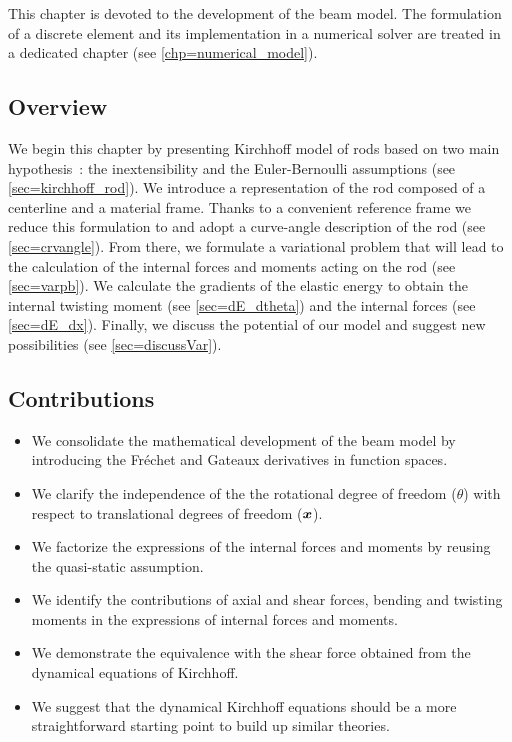 This chapter is devoted to the development of the beam model. The formulation of a discrete element and its implementation in a numerical solver are treated in a dedicated chapter (see \cref{chp=numerical_model}).

\subsection{Overview}
We begin this chapter by presenting Kirchhoff model of rods based on two main hypothesis~: the inextensibility and the Euler-Bernoulli assumptions (see \cref{sec=kirchhoff_rod}). We introduce a  representation of the rod composed of a centerline and a material frame. Thanks to a convenient reference frame we reduce this formulation to  and adopt a curve-angle description of the rod (see \cref{sec=crvangle}). From there, we formulate a variational problem that will lead to the calculation of the internal forces and moments acting on the rod (see \cref{sec=varpb}). We calculate the gradients of the elastic energy to obtain the internal twisting moment (see \cref{sec=dE_dtheta}) and the internal forces (see \cref{sec=dE_dx}). Finally, we discuss the potential of our model and suggest new possibilities (see \cref{sec=discussVar}).

\subsection{Contributions}
\begin{itemize}
\item We consolidate the mathematical development of the beam model by introducing the Fréchet and Gateaux derivatives in function spaces.
\item We clarify the independence of the the rotational degree of freedom ($\theta$) with respect to  translational degrees of freedom ($\boldsymbol{x}$).
\item We factorize the expressions of the internal forces and moments by reusing the quasi-static assumption.
\item We identify the contributions of axial and shear forces, bending and twisting moments in the expressions of internal forces and moments.
\item We demonstrate the equivalence with the shear force obtained from the dynamical equations of Kirchhoff.
\item We suggest that the dynamical Kirchhoff equations should be a more straightforward starting point to build up similar theories.
\end{itemize}


